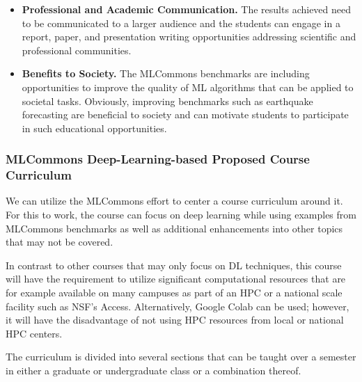 \documentclass[utf8]{FrontiersinVancouver} %
\begin{document}
\begin{itemize}
\item {\bf Professional and Academic Communication.} The results achieved need to be communicated to a larger audience and the students can engage in a report, paper, and presentation writing opportunities addressing scientific and professional communities.

\item {\bf Benefits to Society.} The MLCommons benchmarks are including opportunities to improve the quality of ML algorithms that can be applied to societal tasks. Obviously, improving benchmarks such as earthquake forecasting are beneficial to society and can motivate students to participate in such educational opportunities.

\end{itemize}


\subsubsection{MLCommons Deep-Learning-based Proposed Course Curriculum}

We can utilize the MLCommons effort to center a course curriculum around it. For this to work, the course can focus on deep learning while using examples from MLCommons benchmarks as well as additional enhancements into other topics that may not be covered.

In contrast to other courses that may only focus on DL techniques, this course will have the requirement to utilize significant computational resources that are for example available on many campuses as part of an HPC or a national scale facility such as NSF's Access. Alternatively, Google Colab can be used; however, it will have the disadvantage of not using HPC resources from local or national HPC centers.

The curriculum is divided into several sections that can be taught over a semester in either a graduate or undergraduate class or a combination thereof.
\end{document}
